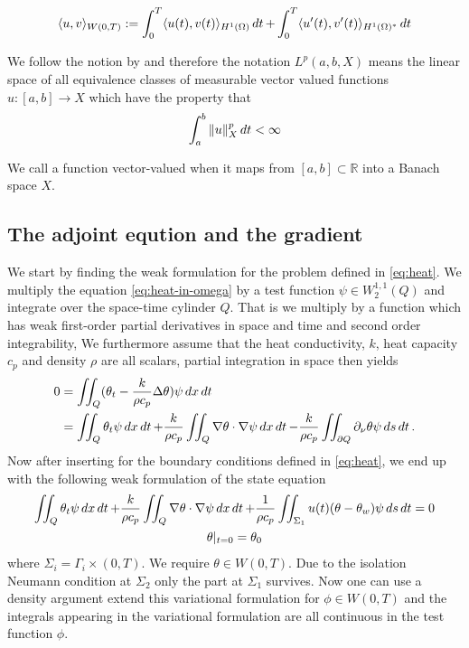 \begin{equation*}
    \langle u, v \rangle_{W(0,T)} := \int_{0}^T\langle u(t),v(t) \rangle _{H^{1}(\Omega)}\mathop{dt}  +  \int_{0}^T \langle u'(t), v'(t) \rangle_{H^{1}(\Omega)^{*}}\mathop{dt} 
\end{equation*}

We follow the notion by \cite{optimalControl} and therefore the notation $L^{p}(a,b,X)$ means the linear space of all equivalence classes of measurable vector valued functions $u:[a,b] \rightarrow X$ which have the property that
\begin{equation*}
    \int_{a}^b\|u\|_X^p \mathop{dt}<\infty
\end{equation*}

We call a function vector-valued when it maps from $[a,b] \subset \mathbb{R}$ into a Banach space $X$. 

\subsection{The adjoint eqution and the gradient}
We start by finding the weak formulation for the problem defined in \eqref{eq:heat}. We multiply the equation \eqref{eq:heat-in-omega} by a test function $\psi\in W_2^{1,1}(Q)$ and integrate over the space-time cylinder $Q$. That is we multiply by a function which has weak first-order partial derivatives in space and time and second order integrability, We furthermore assume that the heat conductivity, $k$, heat capacity $c_p$ and density $\rho$ are all scalars, partial integration in space then yields 
\begin{equation}
\begin{aligned}
  0 &= \iint_Q (\theta_t - \frac{k}{\rho c_p}\Delta\theta)\psi\mathop{dx}\mathop{dt}  \\
  &= \iint_Q \theta_t\psi\mathop{dx}\mathop{dt} + \frac{k}{\rho c_p}\iint_Q\nabla\theta \cdot \nabla\psi\mathop{dx}\mathop{dt} - \frac{k}{\rho c_p}\iint_{\partial Q}\partial_\nu\theta\psi\mathop{ds}\mathop{dt}.
\end{aligned}
\end{equation}
Now after inserting for the boundary conditions defined in \eqref{eq:heat}, we end up with the following weak formulation of the state equation
\begin{equation}\label{eq:weak-form}
\begin{gathered}
  \iint_Q \theta_t\psi\mathop{dx}\mathop{dt} + \frac{k}{\rho c_p}\iint_Q\nabla\theta \cdot \nabla\psi\mathop{dx}\mathop{dt} + \frac{1}{\rho c_p}\iint_{\Sigma_1} u(t)(\theta - \theta_w)\psi\mathop{ds}\mathop{dt} = 0\\
  \theta|_{t=0} = \theta_0
\end{gathered}
\end{equation}
where $\Sigma_i = \Gamma_i\times(0,T)$. We require $\theta \in W(0,T)$. Due to the isolation Neumann condition at $\Sigma_2$ only the part at $\Sigma_1$ survives. Now one can use a density argument extend this variational formulation for $\phi \in W(0,T)$ and the integrals appearing in the variational formulation are all continuous in the test function $\phi$. \bigskip

